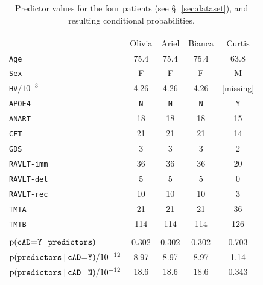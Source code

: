 \documentclass[a4paper,12pt,%
onecolumn,oneside,article,%
british%
]{memoir}
\theoremstyle{remark}
\theoremstyle{innote}
\newcommand*{\pencil}{{\fontencoding{U}\fontfamily{fontawesometwo}\selectfont\symbol{210}}}
\newcommand{\mynotep}[1]{{\footnotesize\color{notecolour}\pencil\ #1}}
\newcommand*{\p}{\mathrm{p}}%
\renewcommand*{\|}[1][]{\nonscript\:#1\vert\nonscript\:\mathopen{}}
\newcommand*{\mo}[1][=]{\mathclose{}\mathord{\nonscript\mkern0.5mu#1\nonscript\mkern0.5mu}\mathopen{}}
\newcommand*{\sect}{\S}%
\newcommand*{\age}{\texttt{Age}}
\newcommand*{\sex}{\texttt{Sex}}
\newcommand*{\apoe}{\texttt{APOE4}}
\newcommand*{\hv}{\texttt{HV}}
\newcommand*{\anart}{\texttt{ANART}}
\newcommand*{\cft}{\texttt{CFT}}
\newcommand*{\gds}{\texttt{GDS}}
\newcommand*{\ravltimm}{\texttt{RAVLT-imm}}
\newcommand*{\ravltdel}{\texttt{RAVLT-del}}
\newcommand*{\ravltrec}{\texttt{RAVLT-rec}}
\newcommand*{\tmta}{\texttt{TMTA}}
\newcommand*{\tmtb}{\texttt{TMTB}}
\newcommand*{\cad}{\texttt{cAD}}
\newcommand*{\yes}{\texttt{Y}}
\newcommand*{\no}{\texttt{N}}
\newcommand*{\predictors}{\texttt{predictors}}
\begin{document}
\begin{table}
  \centering
  \begin{tabular}[b]{lcccc}
    \hline\\[-1.5\jot]
    &{\small Olivia} &{\small Ariel} &{\small Bianca} &{\small Curtis}
    \\[2\jot]
    \age&75.4&75.4&75.4&63.8 \\
    \sex&F&F&F&M \\
    \hv${}/10^{-3}$&4.26&4.26&4.26&[missing] \\
    \apoe&\no&\no&\no&\yes \\
    \anart&18&18&18&15 \\
    \cft&21&21&21&14 \\
    \gds&3&3&3&2 \\
    \ravltimm &36&36&36&20 \\
    \ravltdel &5&5&5&0 \\
   \ravltrec &10&10&10&3 \\
    \tmta&21&21&21&36 \\
    \tmtb&114&114&114&126
    \\[\jot]
    \hline\\
    {\small $\p(\cad\mo\yes \| \predictors)$}&
    0.302&0.302&0.302&0.703
    \\
    {\small $\p(\predictors \| \cad\mo\yes)/10^{-12}$}&
    8.97&8.97&8.97&1.14
    \\
    {\small $\p(\predictors \| \cad\mo\no)/10^{-12}$}&
    18.6&18.6&18.6&0.343
    \\[\jot]
    \hline
  \end{tabular}\hfill
  \caption{Predictor values for the four patients (see \sect\,~\ref{sec:dataset}), and resulting conditional probabilities.}\label{tab:patients_data}
\end{table}
\end{document}
